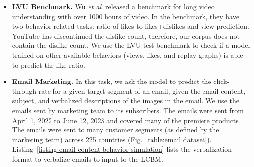 \begin{enumerate}[leftmargin=*]
    \begin{itemize}
        \item\textbf{LVU Benchmark.} Wu \textit{et al.} \cite{wu2021towards} released a benchmark for long video understanding with over 1000 hours of video. In the benchmark, they have two behavior related tasks: ratio of likes to likes+dislikes and view prediction. YouTube has discontinued the dislike count, therefore, our corpus does not contain the dislike count. We use the LVU test benchmark to check if a model trained on other available behaviors (views, likes, and replay graphs) is able to predict the like ratio.
        
        \item\textbf{\companyName Email Marketing.} In this task, we ask the model to predict the click-through rate for a given target segment of an email, given the email content, subject, and verbalized descriptions of the images in the email. We use the emails sent by \companyName marketing team to its subscribers. The emails were sent from April 1, 2022 to June 12, 2023 and covered many of the premiere products %
        The emails were sent to many customer segments (as defined by the marketing team) across 225 countries (Fig.~\ref{table:email dataset}). Listing~\ref{listing-email-content-behavior-simulation} lists the verbalization format to verbalize emails to input to the LCBM. 
    \end{itemize}
\end{enumerate}







